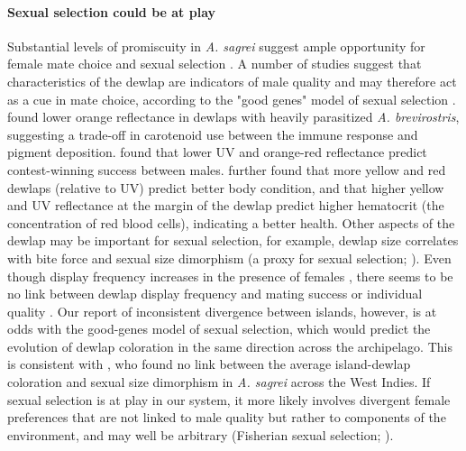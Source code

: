 \paragraph{Sexual selection could be at play} Substantial levels of promiscuity in \textit{A. sagrei} suggest ample opportunity for female mate choice and sexual selection \citep{Kamath2018}. A number of studies suggest that characteristics of the dewlap are indicators of male quality and may therefore act as a cue in mate choice, according to the "good genes" model of sexual selection \citep{Andersson1994}. \citet{Cook2013} found lower orange reflectance in dewlaps with heavily parasitized \textit{A. brevirostris}, suggesting a trade-off in carotenoid use between the immune response and pigment deposition. \citet{Steffen2014} found that lower UV and orange-red reflectance predict contest-winning success between males. \citet{Driessens2015} further found that more yellow and red dewlaps (relative to UV) predict better body condition, and that higher yellow and UV reflectance at the margin of the dewlap predict higher hematocrit (the concentration of red blood cells), indicating a better health. Other aspects of the dewlap may be important for sexual selection, for example, dewlap size correlates with bite force \citep{Vanhooydonck2005} and sexual size dimorphism (a proxy for sexual selection; \citealt{Vanhooydonck2009}). Even though display frequency increases in the presence of females \citep{Driessens2014}, there seems to be no link between dewlap display frequency and mating success \citep{Tokarz2002, Tokarz2005} or individual quality \citep{Driessens2015}. Our report of inconsistent divergence between islands, however, is at odds with the good-genes model of sexual selection, which would predict the evolution of dewlap coloration in the same direction across the archipelago. This is consistent with \citet{Baeckens2018}, who found no link between the average island-dewlap coloration and sexual size dimorphism in \textit{A. sagrei} across the West Indies. If sexual selection is at play in our system, it more likely involves divergent female preferences that are not linked to male quality but rather to components of the environment, and may well be arbitrary (Fisherian sexual selection; \citealt{Andersson1994}).


